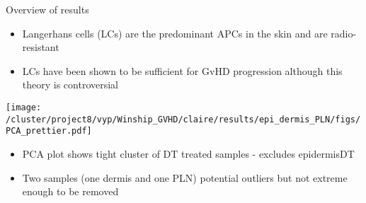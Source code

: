 \documentclass[final,hyperref={pdfpagelabels=false}]{beamer}
\begin{document}
\begin{frame}{}
\begin{columns}[t]
\begin{column}{.36\linewidth}
    \begin{block}{Overview of results}
    
    
    \begin{itemize} %
    \item Langerhans cells (LCs) are the predominant APCs in the skin and are radio-resistant  
    \item LCs have been shown to be sufficient for GvHD progression although this theory is controversial  
    \end{itemize}
      
    \hfill
    
    \begin{minipage}{0.6\textwidth}
      \texttt{[image: /cluster/project8/vyp/Winship\_GVHD/claire/results/epi\_dermis\_PLN/figs/PCA\_prettier.pdf]}
    \end{minipage}
    \begin{minipage}{0.3\textwidth}
      {\small
	\begin{itemize}
	\item PCA plot shows tight cluster of DT treated samples - excludes epidermisDT
	\item Two samples (one dermis and one PLN) potential outliers but not extreme enough to be removed 
      \end{itemize}}
\end{minipage}
\end{block}
\vspace{3cm}


\end{column}
\end{columns}
\end{frame}
\end{document}
